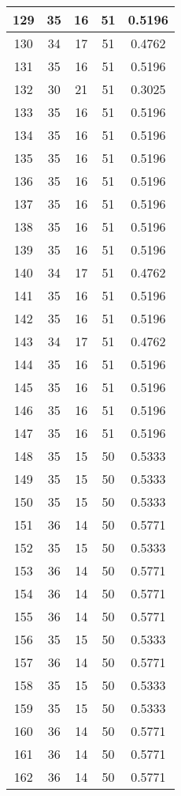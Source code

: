 \documentclass[letterpaper, 12pt]{article}
\begin{document}
\begin{longtable}{|c|c|c|c|c|}
\hline
129 & 35 & 16 & 51 & 0.5196 \\
\hline
130 & 34 & 17 & 51 & 0.4762 \\
\hline
131 & 35 & 16 & 51 & 0.5196 \\
\hline
132 & 30 & 21 & 51 & 0.3025 \\
\hline
133 & 35 & 16 & 51 & 0.5196 \\
\hline
134 & 35 & 16 & 51 & 0.5196 \\
\hline
135 & 35 & 16 & 51 & 0.5196 \\
\hline
136 & 35 & 16 & 51 & 0.5196 \\
\hline
137 & 35 & 16 & 51 & 0.5196 \\
\hline
138 & 35 & 16 & 51 & 0.5196 \\
\hline
139 & 35 & 16 & 51 & 0.5196 \\
\hline
140 & 34 & 17 & 51 & 0.4762 \\
\hline
141 & 35 & 16 & 51 & 0.5196 \\
\hline
142 & 35 & 16 & 51 & 0.5196 \\
\hline
143 & 34 & 17 & 51 & 0.4762 \\
\hline
144 & 35 & 16 & 51 & 0.5196 \\
\hline
145 & 35 & 16 & 51 & 0.5196 \\
\hline
146 & 35 & 16 & 51 & 0.5196 \\
\hline
147 & 35 & 16 & 51 & 0.5196 \\
\hline
148 & 35 & 15 & 50 & 0.5333 \\
\hline
149 & 35 & 15 & 50 & 0.5333 \\
\hline
150 & 35 & 15 & 50 & 0.5333 \\
\hline
151 & 36 & 14 & 50 & 0.5771 \\
\hline
152 & 35 & 15 & 50 & 0.5333 \\
\hline
153 & 36 & 14 & 50 & 0.5771 \\
\hline
154 & 36 & 14 & 50 & 0.5771 \\
\hline
155 & 36 & 14 & 50 & 0.5771 \\
\hline
156 & 35 & 15 & 50 & 0.5333 \\
\hline
157 & 36 & 14 & 50 & 0.5771 \\
\hline
158 & 35 & 15 & 50 & 0.5333 \\
\hline
159 & 35 & 15 & 50 & 0.5333 \\
\hline
160 & 36 & 14 & 50 & 0.5771 \\
\hline
161 & 36 & 14 & 50 & 0.5771 \\
\hline
162 & 36 & 14 & 50 & 0.5771 \\

\end{longtable}
\end{document}
